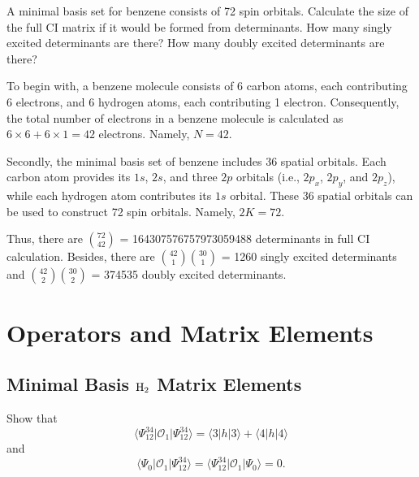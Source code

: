 \documentclass[a4paper]{book}
\newcounter{exercise}[chapter]
\newcounter{solution}[chapter]
\begin{document}
	\begin{exercise}
	A minimal basis set for benzene consists of 72 spin orbitals. Calculate the size of the full CI matrix if it would be formed from determinants. How many singly excited determinants are there? How many doubly excited determinants are there?
	\end{exercise}
	
	\begin{solution}
	
	To begin with, a benzene molecule consists of 6 carbon atoms, each contributing 6 electrons, and 6 hydrogen atoms, each contributing 1 electron. Consequently, the total number of electrons in a benzene molecule is calculated as $6 \times 6 + 6 \times 1 = 42$ electrons. Namely, $N=42$.
	
	Secondly, the minimal basis set of benzene includes 36 spatial orbitals. Each carbon atom provides its $1s$, $2s$, and three $2p$ orbitals (i.e., $2p_x$, $2p_y$, and $2p_z$), while each hydrogen atom contributes its $1s$ orbital. These 36 spatial orbitals can be used to construct 72 spin orbitals. Namely, $2K=72$.
	
	Thus, there are $\binom{72}{42}$ = 164307576757973059488 determinants in full CI calculation. Besides, there are $\binom{42}{1} \binom{30}{1}$ = 1260 singly excited determinants and $\binom{42}{2} \binom{30}{2}$ = 374535 doubly excited determinants.
	\end{solution}
	
	\section{Operators and Matrix Elements}
	
	\subsection{Minimal Basis \texorpdfstring{$\ce{H2}$}- Matrix Elements}
	
	\begin{exercise}
	Show that
	\[
		\langle \Psi^{34}_{12} | \mathscr{O}_1 | \Psi^{34}_{12} \rangle = \langle 3 | h | 3 \rangle + \langle 4 | h | 4 \rangle
	\]
	and
	\[
		\langle \Psi_0 | \mathscr{O}_1 | \Psi^{34}_{12} \rangle = \langle \Psi^{34}_{12} | \mathscr{O}_1 | \Psi_0 \rangle = 0.
	\]
	\end{exercise}
	
\end{document}
